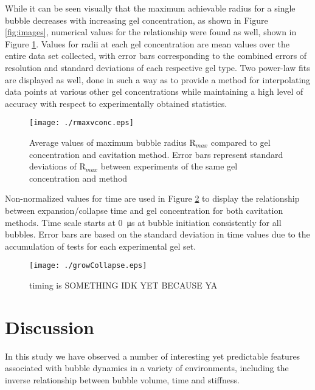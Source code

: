 \documentclass[prl,aps,epsf,twocolumn,superscriptaddress]{revtex4-1}
\begin{document}
While it can be seen visually that the maximum achievable radius for a single bubble decreases with increasing gel concentration, as shown in Figure \ref{fig:images}, numerical values for the relationship were found as well, shown in Figure \ref{fig:vconc}. Values for radii at each gel concentration are mean values over the entire data set collected, with error bars corresponding to the combined errors of resolution and standard deviations of each respective gel type. Two power-law fits are displayed as well, done in such a way as to provide a method for interpolating data points at various other gel concentrations while maintaining a high level of accuracy with respect to experimentally obtained statistics.  

\begin{figure}[ht!]
	\begin{center} 
		\texttt{[image: ./rmaxvconc.eps]} 
	\end{center}
	\caption{Average values of maximum bubble radius R$_{max}$ compared to gel concentration and cavitation method. Error bars represent standard deviations of R$_{max}$ between experiments of the same gel concentration and method}
	\label{fig:vconc}
\end{figure}

Non-normalized values for time are used in Figure \ref{fig:growCollapse} to display the relationship between expansion/collapse time and gel concentration for both cavitation methods. Time scale starts at \SI{0}{\us} at bubble initiation consistently for all bubbles. Error bars are based on the standard deviation in time values due to the accumulation of tests for each experimental gel set.

\begin{figure}[ht!]
	\begin{center} 
		\texttt{[image: ./growCollapse.eps]} 
	\end{center}
	\caption{timing is SOMETHING IDK YET BECAUSE YA}
	\label{fig:growCollapse}
\end{figure}

\section{Discussion} %
In this study we have observed a number of interesting yet predictable features associated with bubble dynamics in a variety of environments, including the inverse relationship between bubble volume, time and stiffness. 
\end{document}
